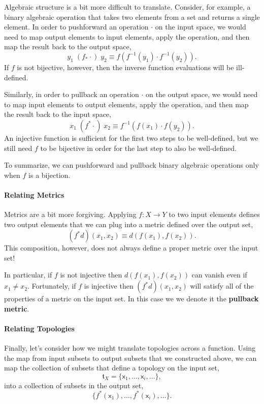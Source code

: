 \documentclass[
  letterpaper,
  DIV=11,
  numbers=noendperiod]{scrartcl}
\let\oldparagraph\paragraph
\renewcommand{\paragraph}[1]{\oldparagraph{#1}\mbox{}}
\begin{document}
Algebraic structure is a bit more difficult to translate. Consider, for
example, a binary algebraic operation that takes two elements from a set
and returns a single element. In order to pushforward an operation
\(\cdot\) on the input space, we would need to map output elements to
input elements, apply the operation, and then map the result back to the
output space, \[
y_1 \; (f_{*} \cdot) \; y_2
\equiv
f \left( f^{-1}(y_1) \cdot f^{-1}(y_2) \right).
\] If \(f\) is not bijective, however, then the inverse function
evaluations will be ill-defined.

Similarly, in order to pullback an operation \(\cdot\) on the output
space, we would need to map input elements to output elements, apply the
operation, and then map the result back to the input space, \[
x_1 \; (f^{*} \cdot) \; x_2
\equiv
f^{-1} \left( f(x_1) \cdot f(y_2) \right).
\] An injective function is sufficient for the first two steps to be
well-defined, but we still need \(f\) to be bijective in order for the
last step to also be well-defined.

To summarize, we can pushforward and pullback binary algebraic
operations only when \(f\) is a bijection.

\paragraph{Relating Metrics}\label{relating-metrics}

Metrics are a bit more forgiving. Applying \(f : X \rightarrow Y\) to
two input elements defines two output elements that we can plug into a
metric defined over the output set, \[
(f^{*} d)(x_1, x_2) \equiv d(f(x_1), f(x_2)).
\] This composition, however, does not always define a proper metric
over the input set!

In particular, if \(f\) is not injective then \(d(f(x_1), f(x_2))\) can
vanish even if \(x_1 \ne x_2\). Fortunately, if \(f\) is injective then
\((f^{*} d)(x_1, x_2)\) will satisfy all of the properties of a metric
on the input set. In this case we we denote it the \textbf{pullback
metric}.

\paragraph{Relating Topologies}\label{relating-topologies}

Finally, let's consider how we might translate topologies across a
function. Using the map from input subsets to output subsets that we
constructed above, we can map the collection of subsets that define a
topology on the input set, \[
\mathfrak{t}_{X}
=
\{ \mathsf{x}_{1}, \ldots, \mathsf{x}_{i}, \ldots \},
\] into a collection of subsets in the output set, \[
\{
  f^{*}(\mathsf{x}_{1}), \ldots, f^{*}(\mathsf{x}_{i}), \ldots
\}.
\]
\end{document}
